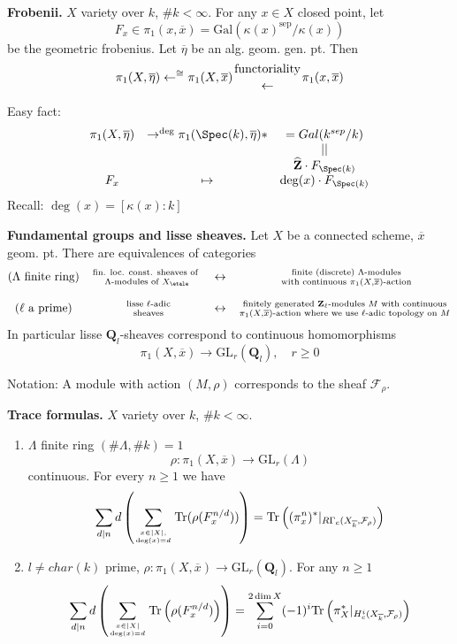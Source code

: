 \medskip\noindent
{\bf Frobenii.} $X$ variety over $k$, $\# k < \infty$. For any $x \in X$
closed point, let
$$
F_x\in \pi_1(x, \overline{x}) =
\text{Gal}(\kappa(x)^{\text{sep}}/\kappa(x))
$$
be the geometric frobenius.
Let $\overline\eta$ be an alg. geom. gen. pt. Then
$$
\pi_1(X, \overline\eta) \leftarrow^{\cong}
\pi_1(X, \overline{x})
{\text{functoriality} \atop \leftarrow} \pi_1(x, \overline{x})
$$

Easy fact:
$$
\begin{matrix}
\pi_1(X, \overline \eta) & \to^{\deg} \pi_1(\Spec(k), \overline \eta) * &
= Gal(k^{sep}/k) \\
& & || \\
& & \widehat{\mathbf{Z}}\cdot F_{\Spec(k)} \\
F_x & \mapsto & \deg(x)\cdot F_{\Spec(k)}
\end{matrix}
$$
Recall: $\deg(x) = [\kappa(x):k]$

\medskip\noindent
{\bf Fundamental groups and lisse sheaves.}
Let $X$ be a connected scheme, $\overline{x}$ geom. pt. There are
equivalences of categories
$$
\begin{matrix}
(\Lambda\text{ finite ring}) &
\text{fin. loc. const. sheaves of }
\atop \Lambda\text{-modules of }X_\etale & \leftrightarrow &
\text{ finite (discrete) }\Lambda\text{-modules}
\atop \text{ with continuous }\pi_1(X, \overline{x})\text{-action}\\
\\
(\ell\text{ a prime}) & \text{ lisse }\ell\text{-adic} \atop \text{ sheaves} &
\leftrightarrow &
\text{finitely generated }\mathbf{Z}_\ell
\text{-modules }M\text{ with continuous}
\atop \pi_1(X, \overline{x})\text{-action where we use }
\ell\text{-adic topology on }M
\end{matrix}
$$
In particular lisse $\mathbf{Q}_l$-sheaves correspond to continuous
homomorphisms
$$
\pi_1(X, \overline{x}) \to \text{GL}_r(\mathbf{Q}_l), \quad r\geq 0
$$

Notation: A module with action $(M, \rho)$ corresponds to the sheaf
$\mathcal{F}_\rho$.

\medskip\noindent
{\bf Trace formulas.} $X$ variety over $k$, $\# k < \infty$.
\begin{enumerate}
\item $\Lambda$ finite ring $(\# \Lambda, \# k)=1$
$$
\rho : \pi_1(X, \overline{x})\to \text{GL}_r(\Lambda)
$$
continuous. For every $n\geq 1$ we have
$$
\sum_{d|n}d\left(
\sum_{x\in |X|, \atop \deg(x)=d}
\text{Tr}(\rho(F_x^{n/d}))\right) =
\text{Tr}\left(
(\pi_x^n)^* |_{R\Gamma_c(X_{\overline{k}}, \mathcal{F}_\rho)}\right)
$$
\item $l\neq char(k)$ prime, $\rho : \pi_1(X, \overline{x})\to
\text{GL}_r(\mathbf{Q}_l)$. For any $n\geq 1$
$$
\sum_{d|n} d\left(
\sum_{x\in |X| \atop \deg(x)=d}
\text{Tr}
\left(
\rho(F_x^{n/d})
\right)
\right) =
\sum_{i = 0}^{2\dim X}
(-1)^i
\text{Tr}\left(
\pi_X^* |_{H_c^i(X_{\overline{k}}, \mathcal{F}_\rho)}\right)
$$
\end{enumerate}

